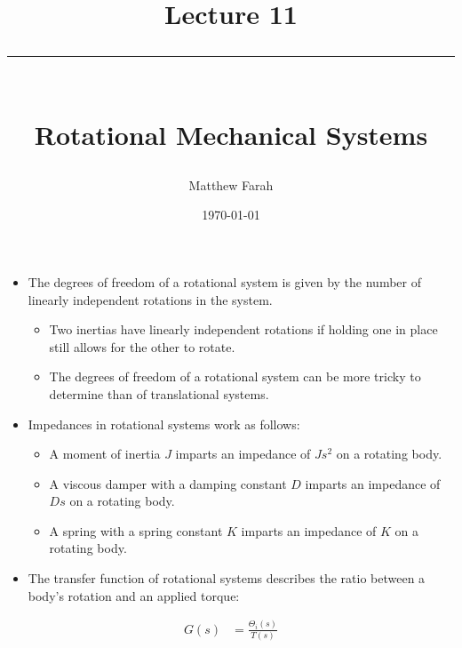 \documentclass{article}
\date{
	\vspace{-.75em}
	{\large \today}
}
\title{
	\vspace*{-1.5em}
	{\Huge Lecture 11} \\
	\vspace{-1em}
	\rule{\textwidth/4}{.01em} \\
	\vspace{-.25em}
	{\Large Rotational Mechanical Systems}
	\vspace{-.75em}
}
\author{
	{\large Matthew Farah}
}
\begin{document}
\maketitle
\pagestyle{fancy}

\fi

\begin{itemize}
	\item The degrees of freedom of a rotational system is given by the number of linearly independent rotations in the system.
	\begin{itemize}
		\item Two inertias have linearly independent rotations if holding one in place still allows for the other to rotate.
		\item The degrees of freedom of a rotational system can be more tricky to determine than of translational systems.
	\end{itemize}

	\item Impedances in rotational systems work as follows:
	\begin{itemize}
		\item A moment of inertia $J$ imparts an impedance of $Js^2$ on a rotating body.
		\item A viscous damper with a damping constant $D$ imparts an impedance of $Ds$ on a rotating body.
		\item A spring with a spring constant $K$ imparts an impedance of $K$ on a rotating body.
	\end{itemize}
	\item The transfer function of rotational systems describes the ratio between a body's rotation and an applied torque:
\end{itemize}

\begin{align*}
	G(s) &= \frac{\Theta_i(s)}{T(s)}
\end{align*}
\end{document}
